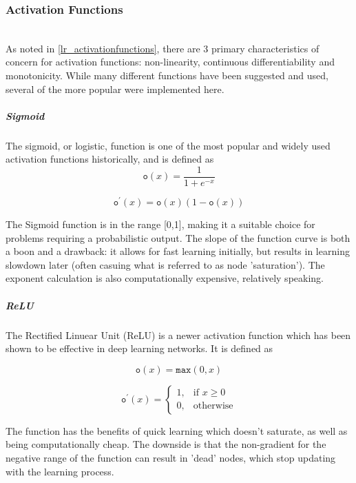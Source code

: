 \documentclass[a4paper,11pt,oneside]{article}
\theoremstyle{plain}
\theoremstyle{definition}
\begin{document}
\subsubsection{Activation Functions}\label{imp_activation_functions}
~\\
As noted in \ref{lr_activationfunctions}, there are 3 primary characteristics of concern for activation functions: non-linearity, continuous differentiability and monotonicity. While many different functions have been suggested and used, several of the more popular were implemented here.

\subparagraph{Sigmoid}

The sigmoid, or logistic, function is one of the most popular and widely used activation functions historically, and is defined as 
\begin{equation}\label{func_sigmoid}
\texttt{o}(x) = \frac{1}{1 + e^{-x}}
\end{equation}

\begin{equation}\label{func_sigmoidprime}
\texttt{o}^\prime(x) = \texttt{o}(x)(1-\texttt{o}(x))
\end{equation}

The Sigmoid function is in the range [0,1], making it a suitable choice for problems requiring a probabilistic output. The slope of the function curve is both a boon and a drawback: it allows for fast learning initially, but results in learning slowdown later (often casuing what is referred to as node 'saturation'). The exponent calculation is also computationally expensive, relatively speaking.

\subparagraph{ReLU}

The Rectified Linuear Unit (ReLU) is a newer activation function which has been shown to be effective in deep learning networks. It is defined as

\begin{equation}\label{func_relu}
\texttt{o}(x) = \texttt{max}(0, x)
\end{equation}

\begin{equation}\end{equation}\label{func_relu_prime}
\[
\texttt{o}^\prime(x)= 
\begin{cases}
1,& \text{if } x\geq 0\\
0,              & \text{otherwise}
\end{cases}
\]

The function has the benefits of quick learning which doesn't saturate, as well as being computationally cheap. The downside is that the non-gradient for the negative range of the function can result in 'dead' nodes, which stop updating with the learning process.
\end{document}
